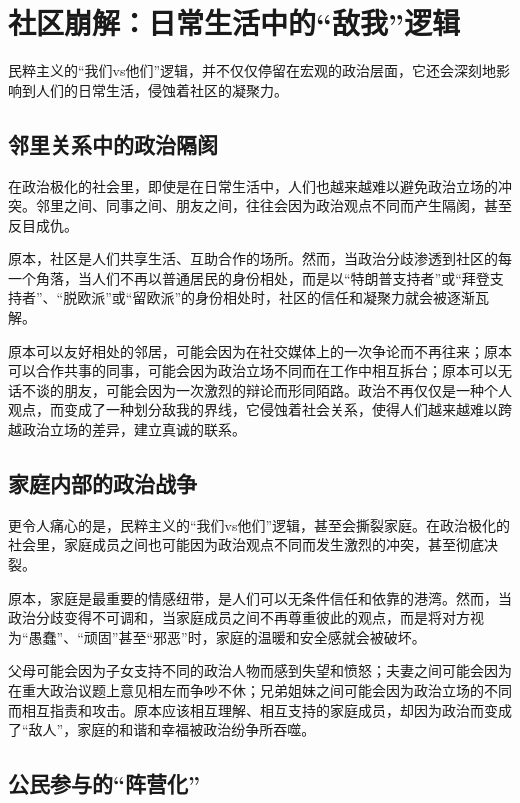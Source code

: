 \section{社区崩解：日常生活中的“敌我”逻辑}

民粹主义的“我们vs他们”逻辑，并不仅仅停留在宏观的政治层面，它还会深刻地影响到人们的日常生活，侵蚀着社区的凝聚力。

\subsection{邻里关系中的政治隔阂}

在政治极化的社会里，即使是在日常生活中，人们也越来越难以避免政治立场的冲突。邻里之间、同事之间、朋友之间，往往会因为政治观点不同而产生隔阂，甚至反目成仇。

原本，社区是人们共享生活、互助合作的场所。然而，当政治分歧渗透到社区的每一个角落，当人们不再以普通居民的身份相处，而是以“特朗普支持者”或“拜登支持者”、“脱欧派”或“留欧派”的身份相处时，社区的信任和凝聚力就会被逐渐瓦解。

原本可以友好相处的邻居，可能会因为在社交媒体上的一次争论而不再往来；原本可以合作共事的同事，可能会因为政治立场不同而在工作中相互拆台；原本可以无话不谈的朋友，可能会因为一次激烈的辩论而形同陌路。政治不再仅仅是一种个人观点，而变成了一种划分敌我的界线，它侵蚀着社会关系，使得人们越来越难以跨越政治立场的差异，建立真诚的联系。

\subsection{家庭内部的政治战争}

更令人痛心的是，民粹主义的“我们vs他们”逻辑，甚至会撕裂家庭。在政治极化的社会里，家庭成员之间也可能因为政治观点不同而发生激烈的冲突，甚至彻底决裂。

原本，家庭是最重要的情感纽带，是人们可以无条件信任和依靠的港湾。然而，当政治分歧变得不可调和，当家庭成员之间不再尊重彼此的观点，而是将对方视为“愚蠢”、“顽固”甚至“邪恶”时，家庭的温暖和安全感就会被破坏。

父母可能会因为子女支持不同的政治人物而感到失望和愤怒；夫妻之间可能会因为在重大政治议题上意见相左而争吵不休；兄弟姐妹之间可能会因为政治立场的不同而相互指责和攻击。原本应该相互理解、相互支持的家庭成员，却因为政治而变成了“敌人”，家庭的和谐和幸福被政治纷争所吞噬。

\subsection{公民参与的“阵营化”}

